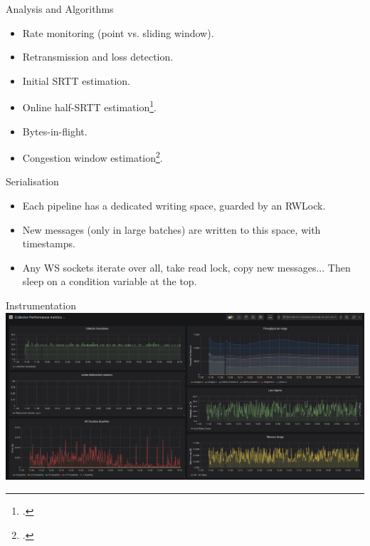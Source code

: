 \documentclass[aspectratio=169,xcolor={dvipsnames}
,notes
,handout
]{beamer}
\begin{document}

\begin{frame}{Analysis and Algorithms}
	\begin{itemize}[<+- | alert@+>]
		\item Rate monitoring (point vs. sliding window).
		\item Retransmission and loss detection.
		\item Initial SRTT estimation.
		\item Online half-SRTT estimation\footcite{DBLP:journals/ccr/KarnP87}.
		\item Bytes-in-flight.
		\item Congestion window estimation\footcite{DBLP:conf/sosr/GhasemiBR17}.
	\end{itemize}
\end{frame}

\begin{frame}{Serialisation}
	\begin{itemize}[<+- | alert@+>]
		\item Each pipeline has a dedicated writing space, guarded by an RWLock.
		\item New messages (only in large batches) are written to this space, with timestamps.
		\item Any WS sockets iterate over all, take read lock, copy new messages... \alert{Then sleep on a condition variable at the top}.
	\end{itemize}
\end{frame}

\begin{frame}{Instrumentation}
	\includegraphics[width=\linewidth]{telemetry}
\end{frame}
\end{document}
